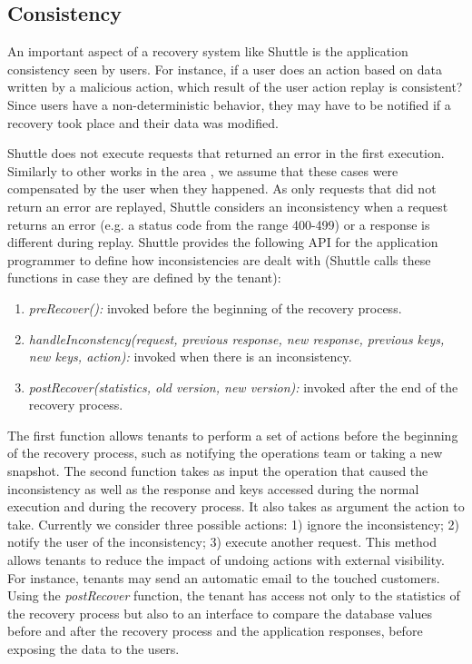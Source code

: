 \subsection{Consistency}
\label{sec:recovery:consistency}

An important aspect of a recovery system like Shuttle is the application consistency seen by users. For instance, if a user does an action based on data written by a malicious action, which result of the user action replay is consistent? Since users have a non-deterministic behavior, they may have to be notified if a recovery took place and their data was modified.

Shuttle does not execute requests that returned an error in the first execution. Similarly to other works in the area \cite{undoForOperators}, we assume that these cases were compensated by the user when they happened. As only requests that did not return an error are replayed, Shuttle considers an inconsistency when a request returns an error (e.g. a status code from the range 400-499) or a response is different during replay. Shuttle provides the following API for the application programmer to define how inconsistencies are dealt with (Shuttle calls these functions in case they are defined by the tenant):

\begin{enumerate}
  \item \textit{preRecover():} invoked before the beginning of the recovery process.
  \item \textit{handleInconstency(request, previous response, new response, previous keys, new keys, action):} invoked when there is an inconsistency.
  \item \textit{postRecover(statistics, old version, new version):} invoked after the end of the recovery process.
\end{enumerate}

The first function allows tenants to perform a set of actions before the beginning of the recovery process, such as notifying the operations team or taking a new snapshot. 
The second function takes as input the operation that caused the inconsistency as well as the response and keys accessed during the normal execution and during the recovery process. It also takes as argument the action to take. Currently we consider three possible actions: 1) ignore the inconsistency; 2) notify the user of the inconsistency; 3) execute another request. This method allows tenants to reduce the impact of undoing actions with external visibility. For instance, tenants may send an automatic email to the touched customers.
Using the \textit{postRecover} function, the tenant has access not only to the statistics of the recovery process but also to an interface to compare the database values before and after the recovery process and the application responses, before exposing the data to the users. 

